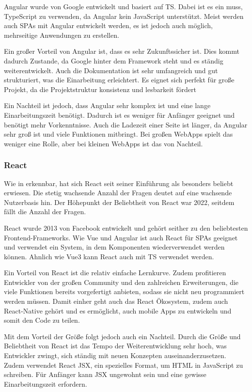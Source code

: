 \documentclass[biblatex]{lni}
\begin{document}
Angular wurde von Google entwickelt und basiert auf \ac{TS}. \cite{NG}
Dabei ist es ein muss, TypeScript zu verwenden, da Angular kein JavaScript unterstützt.
Meist werden auch \ac{SPA}s mit Angular entwickelt werden, es ist jedoch auch möglich, mehrseitige Anwendungen zu erstellen.

Ein großer Vorteil von Angular ist, dass es sehr Zukunftssicher ist. \cite{BStack}
Dies kommt dadurch Zustande, da Google hinter dem Framework steht und es ständig weiterentwickelt.
Auch die Dokumentation ist sehr umfangreich und gut strukturiert, was die Einarbeitung erleichtert. \cite{NG}
Es eignet sich perfekt für große Projekt, da die Projektstruktur konsistenz und lesbarkeit fördert

Ein Nachteil ist jedoch, dass Angular sehr komplex ist und eine lange Einarbeitungszeit benötigt. \cite{BStack}
Dadurch ist es weniger für Anfänger geeignet und benötigt mehr Vorkenntnisse.
Auch die Ladezeit einer Seite ist länger, da Angular sehr groß ist und viele Funktionen mitbringt.
Bei großen WebApps spielt das weniger eine Rolle, aber bei kleinen WebApps ist das von Nachteil.

\subsubsection{React}

Wie in  erkennbar, hat sich React seit seiner Einführung als besonders beliebt erwiesen.
Die stetig wachsende Anzahl der Fragen deutet auf eine wachsende Nutzerbasis hin.
Der Höhepunkt der Beliebtheit von React war 2022, seitdem fällt die Anzahl der Fragen.

React wurde 2013 von Facebook entwickelt und gehört seither zu den beliebtesten Frontend-Frameworks. \cite{BStack}
Wie Vue und Angular ist auch React für \ac{SPA}s geeignet und verwendet ein System, in dem Komponenten wiederverwendet werden können.
Ahnlich wie Vue3 kann React auch mit \ac{TS} verwendet werden.\cite{RCT}

Ein Vorteil von React ist die relativ einfache Lernkurve. \cite{BStack}
Zudem profitieren Entwickler von der großen Community und den zahlreichen Erweiterungen,
die viele Funktionen bereits vorgefertigt anbieten,
sodass sie nicht neu programmiert werden müssen.
Damit einher geht auch das React Ökosystem, zudem auch React-Native gehört und es ermöglicht,
auch mobile Apps zu entwickeln und somit den Code zu teilen. \cite{RCTN}

Mit dem Vorteil der Größe folgt jedoch auch ein Nachteil. \cite{BStack}
Durch die Größe und Beliebtheit von React ist das Tempo der Weiterentwicklung sehr hoch,
was Entwickler zwingt, sich ständig mit neuen Konzepten auseinanderzusetzen.
Zudem verwendet React \ac{JSX}, ein spezielles Format, um \ac{HTML} in JavaScript zu schreiben. \cite{JSX}
Für Anfänger kann \ac{JSX} ungewohnt sein und eine gewisse Einarbeitungszeit erfordern.
\end{document}
